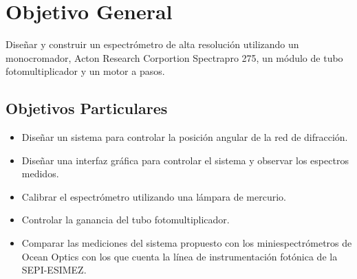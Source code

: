 \chapter*{Objetivo General}
Diseñar y construir un espectrómetro de alta resolución utilizando un monocromador, Acton Research Corportion Spectrapro 275,  un módulo de tubo fotomultiplicador y un motor a pasos.
\section*{Objetivos Particulares}
\begin{itemize}
\item Diseñar un sistema para controlar la posición angular de la red de difracción.

\item Diseñar una interfaz gráfica para controlar el sistema y observar los espectros medidos.

\item Calibrar el espectrómetro utilizando una lámpara de mercurio.

\item Controlar la ganancia del tubo fotomultiplicador.

\item Comparar las mediciones del sistema propuesto con los miniespectrómetros de Ocean Optics con los que cuenta la línea de instrumentación fotónica de la SEPI-ESIMEZ.
\end{itemize}
